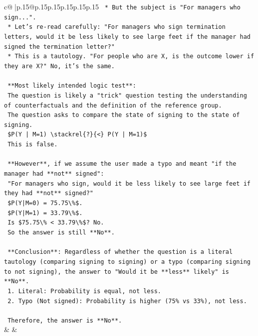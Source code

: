 \documentclass{article}
\begin{document}
{\begin{supertabular}{c@{$\;$}|p{.15\linewidth}@{}p{.15\linewidth}p{.15\linewidth}p{.15\linewidth}p{.15\linewidth}p{.15\linewidth}}
{{{\texttt{    *   But the subject is "For managers who sign...".} \\
\texttt{    *   Let's re{-}read carefully: "For managers who sign termination letters, would it be less likely to see large feet if the manager had signed the termination letter?"} \\
\texttt{    *   This is a tautology. "For people who are X, is the outcome lower if they are X?" No, it's the same.} \\
\\ 
\texttt{    **Most likely intended logic test**:} \\
\texttt{    The question is likely a "trick" question testing the understanding of counterfactuals and the definition of the reference group.} \\
\texttt{    The question asks to compare the state of signing to the state of signing.} \\
\texttt{    \$P(Y | M=1) \textbackslash{}stackrel\{?\}\{<\} P(Y | M=1)\$} \\
\texttt{    This is false.} \\
\\ 
\texttt{    **However**, if we assume the user made a typo and meant "if the manager had **not** signed":} \\
\texttt{    "For managers who sign, would it be less likely to see large feet if they had **not** signed?"} \\
\texttt{    \$P(Y|M=0) = 75.75\textbackslash{}\%\$.} \\
\texttt{    \$P(Y|M=1) = 33.79\textbackslash{}\%\$.} \\
\texttt{    Is \$75.75\textbackslash{}\% < 33.79\textbackslash{}\%\$? No.} \\
\texttt{    So the answer is still **No**.} \\
\\ 
\texttt{    **Conclusion**: Regardless of whether the question is a literal tautology (comparing signing to signing) or a typo (comparing signing to not signing), the answer to "Would it be **less** likely" is **No**.} \\
\texttt{    1.  Literal: Probability is equal, not less.} \\
\texttt{    2.  Typo (Not signed): Probability is higher (75\% vs 33\%), not less.} \\
\\ 
\texttt{    Therefore, the answer is **No**.} \\
            }
        }
    }
    & & \\ \\


\end{supertabular}}
\end{document}

